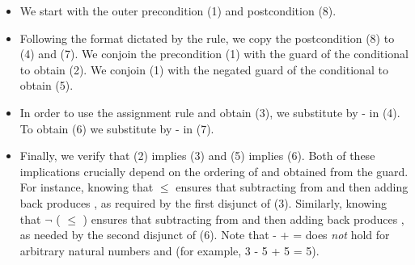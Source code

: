 \documentclass[12pt]{report}
\begin{document}
\begin{itemize}
\item  We start with the outer precondition (1) and postcondition (8).



\item  Following the format dictated by the  rule, we copy the
    postcondition (8) to (4) and (7). We conjoin the precondition (1)
    with the guard of the conditional to obtain (2). We conjoin (1)
    with the negated guard of the conditional to obtain (5).



\item  In order to use the assignment rule and obtain (3), we substitute
     by  -  in (4). To obtain (6) we substitute  by  - 
    in (7).



\item  Finally, we verify that (2) implies (3) and (5) implies (6). Both
    of these implications crucially depend on the ordering of  and
     obtained from the guard. For instance, knowing that  \ensuremath{\le} 
    ensures that subtracting  from  and then adding back 
    produces , as required by the first disjunct of (3). Similarly,
    knowing that \ensuremath{\lnot} ( \ensuremath{\le} ) ensures that subtracting  from 
    and then adding back  produces , as needed by the second
    disjunct of (6). Note that  -  +  =  does \textit{not} hold for
    arbitrary natural numbers  and  (for example, 3 - 5 + 5 =
    5). 
\end{itemize}
\end{document}

